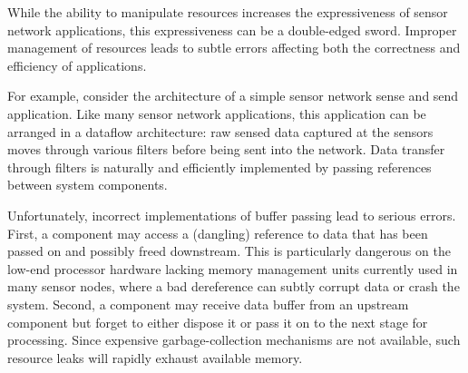 While the ability to manipulate resources increases the expressiveness of
sensor network applications, this expressiveness can be a double-edged
sword.  
%
Improper management of resources leads to subtle errors affecting both the
correctness and efficiency of applications.



For example, consider the architecture of a simple sensor network sense and
send application.  
%
Like many sensor network applications, this application can be arranged in
a dataflow architecture:  raw sensed data captured at the sensors moves
through various filters before being sent into the network.  
%
Data transfer through filters is naturally and efficiently implemented by
passing references between system components.



Unfortunately, incorrect implementations of buffer passing lead to serious
errors.  
%
First, a component may access a (dangling) reference to data that has been
passed on and possibly freed downstream. 
%
This is particularly dangerous on the low-end processor hardware lacking memory
management units currently used in many sensor nodes, where a bad dereference
can subtly corrupt data or crash the system. 
%
Second, a component may receive data buffer from an upstream component but
forget to either dispose it or pass it on to the next stage for processing.
%
Since expensive garbage-collection mechanisms are not available, such
resource leaks will rapidly exhaust available memory.



